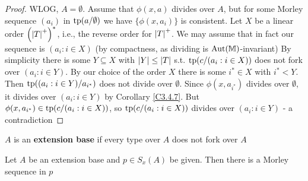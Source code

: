 \documentclass[11pt]{article}
\begin{document}
\begin{proof}
WLOG, \(A=\emptyset\). Assume that \(\phi(x,a)\) divides over \(A\), but for some Morley sequence \((a_i)\)
in \(\operatorname{tp}(a/\emptyset)\) we have \(\{\phi(x,a_i)\}\) is consistent. Let \(X\) be a linear
order \(\left( \abs{T}^+ \right)^*\), i.e., the reverse order for \(\abs{T}^+\). We may assume that
in fact our sequence is \((a_i:i\in X)\) (by compactness, as dividing is \(\operatorname{\text{Aut}}(\mathbb{M})\)-invariant)
By simplicity there is some \(Y\subseteq X\) with \(\abs{Y}\le\abs{T}\) s.t. \(\operatorname{tp}(c/(a_i:i\in X))\) does not
fork over \((a_i:i\in Y)\). By our choice of the order \(X\) there is some \(i^*\in X\)
with \(i^*<Y\). Then \(\operatorname{tp}((a_i:i\in Y)/a_{i^*})\) does not divide over \(\emptyset\).
Since \(\phi(x,a_{i^*})\) divides over \(\emptyset\), it divides over \((a_i:i\in Y)\) by Corollary
\ref{C3.4.7}. But \(\phi(x,a_{i^*})\in\operatorname{tp}(c/(a_i:i\in X))\), so \(\operatorname{tp}(c/(a_i:i\in X))\) divides
over \((a_i:i\in Y)\) - a contradiction
\end{proof}

\begin{definition}[]
\(A\) is an \textbf{extension base} if every type over \(A\) does not fork over \(A\)
\end{definition}

\begin{proposition}[]
Let \(A\) be an extension base and \(p\in S_x(A)\) be given. Then there is a Morley sequence in \(p\)
\end{proposition}
\end{document}
